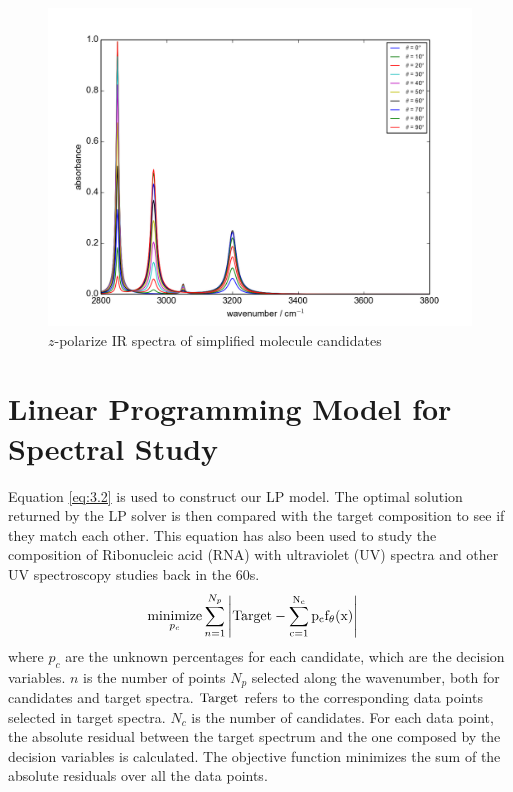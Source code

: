 \begin{figure}[!ht] 
\centering
\includegraphics[scale=0.7]{Figures/Toy_Model_IR_Cosine_Projection.png} 
\caption{$z$-polarize IR spectra of simplified molecule candidates} \label{fig:3.1}
\end{figure}


\section{Linear Programming Model for Spectral Study}

Equation \ref{eq:3.2} is used to construct our LP model. The optimal solution returned by the LP solver is then compared with the target composition to see if they match each other. This equation has also been used to study the composition of Ribonucleic acid (RNA) with ultraviolet (UV) spectra \cite{NYAS:NYAS900} and other UV spectroscopy studies  \cite{LPATUAS} back in the 60s. \\

\begin{eqnarray} \label{eq:3.2}
& \underset{p_{c}} {\text{minimize}} \displaystyle\sum^{N_{p}}_{n=1} \left| \rm Target- \displaystyle\sum^{N_{c}}_{c=1}p_{c}f_{\theta}(x) \right| 
\end{eqnarray}
where $p_{c}$ are the unknown percentages for each candidate, which are the decision variables. $n$ is the number of points $N_{p}$ selected along the wavenumber, both for candidates and target spectra. $\rm Target$ refers to the corresponding data points selected in target spectra. $N_{c}$ is the number of candidates. For each data point, the absolute residual between the target spectrum and the one composed by the decision variables is calculated. The objective function minimizes the sum of the absolute residuals over all the data points. \\

